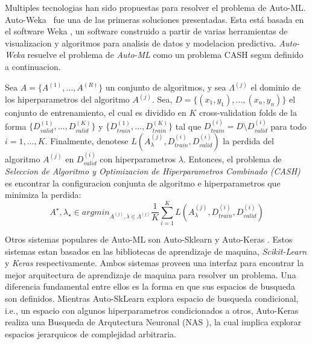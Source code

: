 Multiples tecnologias han sido propuestas para resolver el problema de Auto-ML. Auto-Weka~\cite{autoweka} fue una de las primeras soluciones presentadas. Esta está basada en el software Weka \cite{weka}, un software construido a partir de varias herramientas de visualizacion y algoritmos para analisis de datos y modelacion predictiva. \textit{Auto-Weka} resuelve el problema de \textit{Auto-ML} como un problema CASH segun definido a continuacion.

\begin{definition}
\label{equation:cash}
    Sea $A = \{A^{(1)}, \dots, A^{(R)}\}$ un conjunto de algoritmos, y sea $\Lambda^{(j)}$ el dominio de los hiperparametros del algoritmo $A^{(j)}$. Sea, $D = \{(x_1, y_1), \dots, (x_n, y_n)\}$ el conjunto de entrenamiento, el cual es dividido en $K$ cross-validation folds de la forma $\{D_{valid}^{(1)}, \dots, D_{valid}^{(K)}\}$ y $\{D_{train}^{(1)}, \dots, D_{train}^{(K)}\}$ tal que $D_{train}^{(i)} = D \setminus D_{valid}^{(i)}$ para todo $i = 1, \dots, K$. Finalmente, denotese $L(A_{\lambda}^{(j)}, D_{train}^{(i)},D_{valid}^{(i)})$ la perdida del algoritmo $A^{(j)}$ en $D_{valid}^{(i)}$ con hiperparametros $\lambda$. Entonces, el problema de \textit{Seleccion de Algoritmo y Optimizacion de Hiperparametros Combinado (CASH)} es encontrar la configuracion conjunta de algoritmo e hiperparametros que minimiza la perdida:
    \begin{equation}
        A^{\star}, \lambda_{\star} \in argmin_{A^{(j)}, \lambda \in \Lambda^(j)} \frac{1}{K} \sum_{i=1}^K L(A_{\lambda}^{(j)}, D_{train}^{(i)},D_{valid}^{(i)})
    \end{equation}
\end{definition}

Otros sistemas populares de Auto-ML son Auto-Sklearn \cite{feurer2015efficient} y Auto-Keras \cite{autoKeras}. Estos sistemas estan basados en las bibliotecas de aprendizaje de maquina, \textit{Scikit-Learn} \cite{pedregosa2011scikit} y \textit{Keras} \cite{chollet2015keras} respectivamente. Ambos sistemas proveen una interfaz para encontrar la mejor arquitectura de aprendizaje de maquina para resolver un problema. Una diferencia fundamental entre ellos es la forma en que sus espacios de busqueda son definidos. Mientras Auto-SkLearn explora espacio de busqueda condicional, i.e., un espacio con algunos hiperparametros condicionados a otros, Auto-Keras realiza una Busqueda de Arqutectura Neuronal (NAS \cite{NAS}), la cual implica explorar espacios jerarquicos de complejidad arbitraria.

